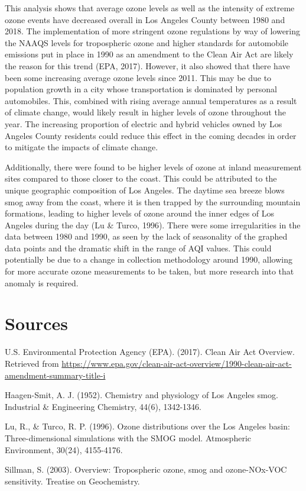 \documentclass[12pt,]{article}
\begin{document}
This analysis shows that average ozone levels as well as the intensity
of extreme ozone events have decreased overall in Los Angeles County
between 1980 and 2018. The implementation of more stringent ozone
regulations by way of lowering the NAAQS levels for tropospheric ozone
and higher standards for automobile emissions put in place in 1990 as an
amendment to the Clean Air Act are likely the reason for this trend
(EPA, 2017). However, it also showed that there have been some
increasing average ozone levels since 2011. This may be due to
population growth in a city whose transportation is dominated by
personal automobiles. This, combined with rising average annual
temperatures as a result of climate change, would likely result in
higher levels of ozone throughout the year. The increasing proportion of
electric and hybrid vehicles owned by Los Angeles County residents could
reduce this effect in the coming decades in order to mitigate the
impacts of climate change.

Additionally, there were found to be higher levels of ozone at inland
measurement sites compared to those closer to the coast. This could be
attributed to the unique geographic composition of Los Angeles. The
daytime sea breeze blows smog away from the coast, where it is then
trapped by the surrounding mountain formations, leading to higher levels
of ozone around the inner edges of Los Angeles during the day (Lu \&
Turco, 1996). There were some irregularities in the data between 1980
and 1990, as seen by the lack of seasonality of the graphed data points
and the dramatic shift in the range of AQI values. This could
potentially be due to a change in collection methodology around 1990,
allowing for more accurate ozone measurements to be taken, but more
research into that anomaly is required.

\newpage

\section{Sources}\label{sources}

U.S. Environmental Protection Agency (EPA). (2017). Clean Air Act
Overview. Retrieved from
\url{https://www.epa.gov/clean-air-act-overview/1990-clean-air-act-amendment-summary-title-i}

Haagen-Smit, A. J. (1952). Chemistry and physiology of Los Angeles smog.
Industrial \& Engineering Chemistry, 44(6), 1342-1346.

Lu, R., \& Turco, R. P. (1996). Ozone distributions over the Los Angeles
basin: Three-dimensional simulations with the SMOG model. Atmospheric
Environment, 30(24), 4155-4176.

Sillman, S. (2003). Overview: Tropospheric ozone, smog and ozone-NOx-VOC
sensitivity. Treatise on Geochemistry.
\end{document}
